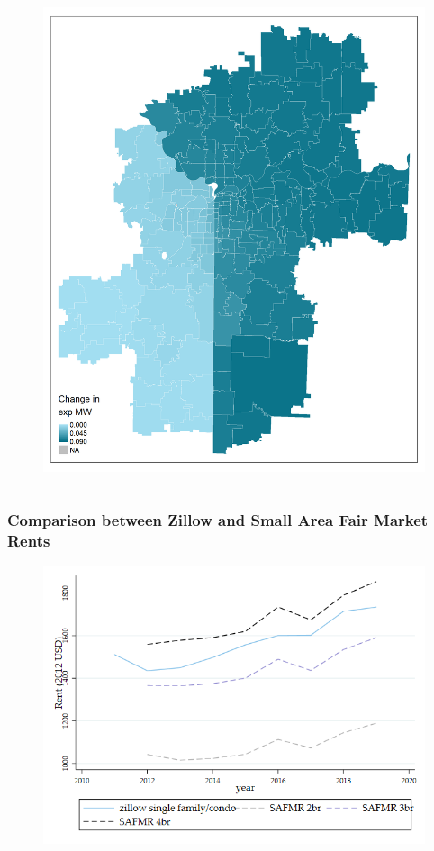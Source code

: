 \documentclass[aspectratio=169, t]{beamer}
\begin{document}
\begin{frame}[label = mw_changes]
\begin{columns}
\begin{column}{0.50\textwidth}
\begin{figure}
                \includegraphics[scale = 0.36]{maps_events/output/kc2018-12_exp_mw.png}
            \end{figure}   
        \end{column}
    \end{columns}
     \hyperlink{chi_example}{}
\end{frame}

\begin{frame}[label = zillow_safmr]
	\frametitle{Comparison between Zillow and Small Area Fair Market Rents}
    \begin{figure}
    	\centering
	\includegraphics[scale = 0.32]{zillow_benchmark/output/trend_zillow_safmr_zipcode_m1.png}
    \end{figure}
	\hyperlink{zillow_data}{}
\end{frame}
\end{document}
